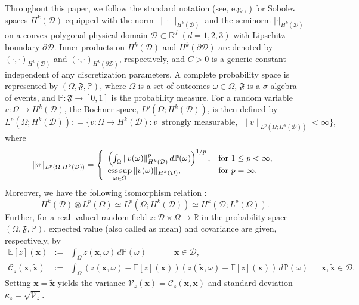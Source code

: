 \documentclass[a4paper,10pt]{article}
\DeclareMathOperator*{\esssup}{ess\,sup}
\newcommand{\bx}{{\boldsymbol{x}}}
\newcommand{\cD}{{\mathcal{D}}}
\numberwithin{theorem}{section}
\begin{document}
Throughout this paper, we follow the standard notation (see, e.g., \cite{RAAdams_1975})  for Sobolev spaces $H^k(\mathcal{D})$ equipped with the norm $\| \cdot \|_{H^k(\mathcal{D})}$ and the seminorm  $| \cdot |_{H^k(\mathcal{D})}$ on a convex polygonal physical domain $\mathcal{D} \subset \mathbb{R}^d$ $(d=1,2,3)$ with Lipschitz boundary $\partial \mathcal{D}$. Inner products  on $H^k(\mathcal{D})$ and $H^k(\partial \mathcal{D})$ are denoted by $( \cdot,\cdot )_{H^k(\mathcal{D})}$ and $( \cdot,\cdot )_{H^k(\partial \mathcal{D})}$, respectively, and $C>0$ is a generic constant independent of any discretization parameters. A complete probability space is represented by $(\Omega, \mathfrak{F}, \mathbb{P})$, where $\Omega$  is a set of outcomes $\omega \in \Omega$, $\mathfrak{F}$ is a $\sigma$-algebra of events, and $\mathbb{P}: \mathfrak{F} \rightarrow [0,1]$ is the probability measure. For a random variable $v: \Omega \rightarrow H^k(\mathcal{D})$, the Bochner space, $L^p(\Omega;H^k(\mathcal{D}))$, is then defined by
\begin{equation*}
L^p(\Omega;H^k(\mathcal{D})): = \{v: \Omega \rightarrow H^k(\mathcal{D}) : v \; \; \text{strongly measurable}, \;  \|v \|_{L^p(\Omega;H^k(\mathcal{D}))} < \infty  \},
\end{equation*}
where
\[
 \|v \|_{L^p(\Omega;H^k(\mathcal{D}))}  = \left\{
                                \begin{array}{ll}
                                     \left( \int_{\Omega} \|v(\omega)\|^p_{H^k(\mathcal{D})} \, d\mathbb{P}(\omega) \right)^{1/p}, & \hbox{for  }  1 \leq p < \infty,\\
                                      \esssup \limits_{\omega \in \Omega} \|v(\omega)\|_{H^k(\mathcal{D})}, & \hbox{for  } p = \infty.
                                \end{array}
                             \right.
\] 
Moreover, we have the following isomorphism relation \cite{IBabuska_RTempone_GEZouraris_2004a}:
\[
    H^k(\mathcal{D}) \otimes L^p(\Omega) \simeq L^p(\Omega;H^k(\mathcal{D})) \simeq  H^k(\mathcal{D};L^p(\Omega)).
\]
Further, for a real--valued random field  $z: \cD \times \Omega \rightarrow \mathbb{R}$ in the probability space $(\Omega, \mathfrak{F}, \mathbb{P})$,  expected value  (also called as mean) and covariance  are given, respectively, by 
\begin{subequations}\label{eqn:cov}
	\begin{eqnarray}
		\mathbb{E}[z](\bx)&:=& \int_{\Omega} z(\bx,\omega) \, d\mathbb{P}(\omega) \qquad \quad \; \bx \in \mathcal{D}, \\
		\mathcal{C}_{z}(\bx,\widetilde{\bx}) &:=&  \int_{\Omega} (z(\bx,\omega) - \mathbb{E}[ z ](\bx)) (z(\widetilde{\bx},\omega) - \mathbb{E}[ z ](\bx) ) \, d\mathbb{P}(\omega) \quad \;\;  \bx,\widetilde{\bx} \in \mathcal{D}. \label{eqn:covb}
	\end{eqnarray}
\end{subequations} 
Setting $\bx=\widetilde{\bx}$ yields the variance $\mathcal{V}_{z}(\bx) = \mathcal{C}_{z}(\bx,\bx)$ and standard deviation $\kappa_{z}= \sqrt{\mathcal{V}_{z}}$.
\end{document}
